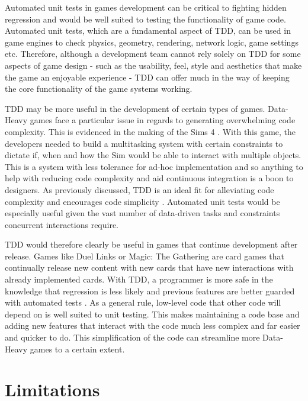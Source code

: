 \documentclass{scrartcl}
\begin{document}
Automated unit tests in games development can be critical to fighting hidden regression \cite{GamaEmbracingFun} and would be well suited to testing the functionality of game code. Automated unit tests, which are a fundamental aspect of TDD, can be used in game engines to check physics, geometry, rendering, network logic, game settings etc. Therefore, although a development team cannot rely solely on TDD for some aspects of game design - such as the usability, feel, style and aesthetics that make the game an enjoyable experience - TDD can offer much in the way of keeping the core functionality of the game systems working. 

TDD may be more useful in the development of certain types of games. Data-Heavy games face a particular issue in regards to generating overwhelming code complexity. This is evidenced in the making of the Sims 4 \cite{GDCConcurrent}. With this game, the developers needed to build a multitasking system with certain constraints to dictate if, when and how the Sim would be able to interact with multiple objects. This is a system with less tolerance for ad-hoc implementation and so anything to help with reducing code complexity and aid continuous integration is a boon to designers.  As previously discussed, TDD is an ideal fit for alleviating code complexity and encourages code simplicity \cite{amrit2017effectiveness}. Automated unit tests would be especially useful given the vast number of data-driven tasks and constraints concurrent interactions require. 

TDD would therefore clearly be useful in games that continue development after release. Games like Duel Links or Magic: The Gathering are card games that continually release new content with new cards that have new interactions with already implemented cards. With TDD, a programmer is more safe in the knowledge that regression is less likely and previous features are better guarded with automated tests \cite{GDCBackwards}. As a general rule, low-level code that other code will depend on is well suited to unit testing\cite{GDCBackwards}. This makes maintaining a code base and adding new features that interact with the code much less complex and far easier and quicker to do. This simplification of the code can streamline more Data-Heavy games to a certain extent.

 



\section*{Limitations}
\end{document}
